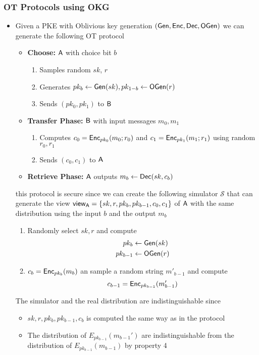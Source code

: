 \subsubsection{OT Protocols using OKG}
\begin{itemize}
    \item Given a PKE with Oblivious key generation $(\mathsf{Gen}, \mathsf{Enc}, \mathsf{Dec}, \mathsf{OGen})$ we can generate the following OT protocol
    \begin{itemize}
        \item \textbf{Choose:} $\mathsf{A}$ with choice bit $b$
        \begin{enumerate}
            \item Samples random $sk$, $r$
            \item Generates $pk_b \leftarrow \mathsf{Gen}(sk), pk_{1-b} \leftarrow \mathsf{OGen}(r)$
            \item Sends $(pk_0, pk_1)$ to $\mathsf{B}$
        \end{enumerate}
        \item \textbf{Transfer Phase:} $\mathsf{B}$ with input messages $m_0, m_1$
        \begin{enumerate}
            \item Computes $c_0 = \mathsf{Enc}_{pk_0}(m_0; r_0)$ and $c_1 = \mathsf{Enc}_{pk_1}(m_1 ; r_1)$ using random $r_0,r_1$
            \item Sends $(c_0, c_1)$ to $\mathsf{A}$
        \end{enumerate}
        \item \textbf{Retrieve Phase:} $\mathsf{A}$ outputs $m_b \leftarrow \mathsf{Dec}(sk, c_b)$
    \end{itemize}
    this protocol is secure since we can create the following simulator $\mathcal S$ that can generate the view $\mathsf{view}_{\mathsf{A}} = \{sk, r, pk_b, pk_{b-1}, c_0, c_1\}$ of $\mathsf{A}$ with the same distribution using the input $b$ and the output $m_b$
    \begin{enumerate}
        \item Randomly select $sk,r$ and compute
        \begin{align*}
            pk_b &\leftarrow \mathsf{Gen}(sk) \\
            pk_{b-1} &\leftarrow \mathsf{OGen}(r)
        \end{align*}
    \item $c_b = \mathsf{Enc}_{pk_b}(m_b)$ an sample a random string $m'_{b-1}$ and compute
    \begin{equation*}
        c_{b-1} = \mathsf{Enc}_{pk_{b-1}}(m'_{b-1})
    \end{equation*}
    \end{enumerate}
    The simulator and the real distribution are indistinguishable since
    \begin{itemize}
        \item $sk,r,pk_b, pk_{b-1}, c_b$ is computed the same way as in the protocol
        \item The distribution of $E_{pk_{b-1}}(m_{b-1}')$ are indistinguishable from the distribution of $E_{pk_{b-1}}(m_{b-1})$ by property 4
    \end{itemize}
\end{itemize}

